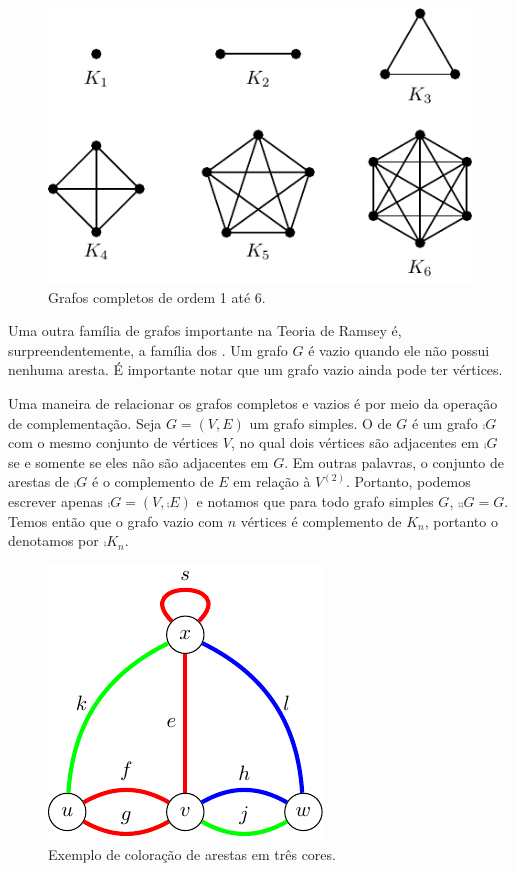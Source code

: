 \begin{figure}[ht!]
\centering
\includegraphics{figures/1_intro_3_complete}
\caption{Grafos completos de ordem 1 até 6.}
\label{fig:intro:complete}
\end{figure}

Uma outra família de grafos importante na Teoria de Ramsey é, surpreendentemente, a família dos . Um grafo $G$ é vazio quando ele não possui nenhuma aresta. É importante notar que um grafo vazio ainda pode ter vértices.

Uma maneira de relacionar os grafos completos e vazios é por meio da operação de complementação. Seja $G = (V,E)$ um grafo simples. O  de $G$ é um grafo $\comp{G}$ com o mesmo conjunto de vértices $V$, no qual dois vértices são adjacentes em $\comp{G}$ se e somente se eles não são adjacentes em $G$. Em outras palavras, o conjunto de arestas de $\comp{G}$ é o complemento de $E$ em relação à $V^{(2)}$. Portanto, podemos escrever apenas $\comp{G} = (V,\comp{E})$ e notamos que para todo grafo simples $G$, $\comp{\comp{G}} = G$.
Temos então que o grafo vazio com $n$ vértices é complemento de $K_n$, portanto o denotamos por $\comp{K_n}$.

\begin{figure}[ht!]
\centering
\includegraphics{figures/1_intro_4_excolouring}
\caption{Exemplo de coloração de arestas em três cores.}
\label{fig:intro:excolouring}
\end{figure}

